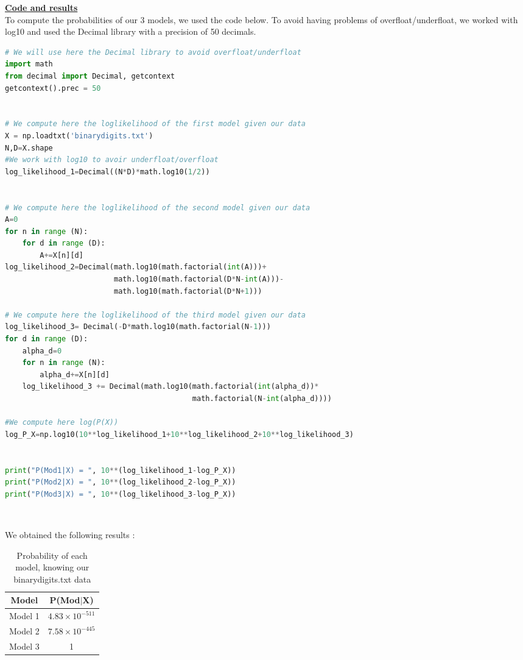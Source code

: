 \documentclass[12pt,a4paper]{report} %
\begin{document}
{ \item \underline{\textbf{Code and results}} \\

To compute the probabilities of our 3 models, we used the code below. To avoid having problems of overfloat/underfloat, we worked with log10 and used the Decimal library with a precision of 50 decimals. \\

\begin{lstlisting}[language=Python, basicstyle=\ttfamily\small, frame=single, breaklines=true]
# We will use here the Decimal library to avoid overfloat/underfloat
import math
from decimal import Decimal, getcontext
getcontext().prec = 50


# We compute here the loglikelihood of the first model given our data
X = np.loadtxt('binarydigits.txt')
N,D=X.shape
#We work with log10 to avoir underfloat/overfloat
log_likelihood_1=Decimal((N*D)*math.log10(1/2)) 


# We compute here the loglikelihood of the second model given our data
A=0
for n in range (N):
    for d in range (D):
        A+=X[n][d]
log_likelihood_2=Decimal(math.log10(math.factorial(int(A)))+
                         math.log10(math.factorial(D*N-int(A)))-
                         math.log10(math.factorial(D*N+1)))

# We compute here the loglikelihood of the third model given our data
log_likelihood_3= Decimal(-D*math.log10(math.factorial(N-1)))
for d in range (D):
    alpha_d=0
    for n in range (N):
        alpha_d+=X[n][d]
    log_likelihood_3 += Decimal(math.log10(math.factorial(int(alpha_d))*
                                           math.factorial(N-int(alpha_d))))

#We compute here log(P(X))
log_P_X=np.log10(10**log_likelihood_1+10**log_likelihood_2+10**log_likelihood_3)


print("P(Mod1|X) = ", 10**(log_likelihood_1-log_P_X))
print("P(Mod2|X) = ", 10**(log_likelihood_2-log_P_X))
print("P(Mod3|X) = ", 10**(log_likelihood_3-log_P_X))
\end{lstlisting} \\
\vspace{1 cm}

We obtained the following results : \\

\begin{table}[h!]
\centering
\begin{tabular}{|c|c|}
\hline
\textbf{Model} & \textbf{P(Mod$|$X)} \\
\hline
Model 1 & \(4.83 \times 10^{-511}\) \\
\hline
Model 2 & \(7.58 \times 10^{-445}\) \\
\hline
Model 3 & 1 \\
\hline
\end{tabular}
\caption{Probability of each model, knowing our binarydigits.txt data}
\end{table} \\

}
\end{document}
